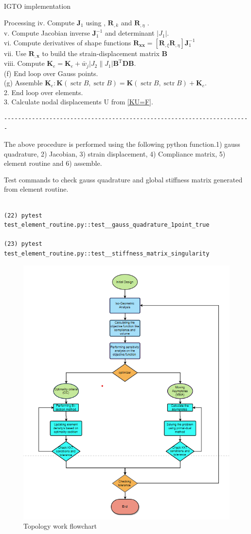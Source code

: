 \documentclass[a4paper,12pt,times]{article}
\begin{document}
\begin{section}{IGTO implementation}
\begin{subsection}{Processing}
iv. Compute $\mathbf{J}_{1}$ using , $\mathbf{R}_{, k}$ and $\mathbf{R}_{, \eta}$ .\\
v. Compute Jacobian inverse $\mathbf{J}_{1}^{-1}$ and determinant $\left|J_{1}\right|$.\\
vi. Compute derivatives of shape functions $\mathbf{R}_{\mathbf{x} \mathbf{x}}=\left[\mathbf{R}_{, \xi} \mathbf{R}_{, \eta}\right] \mathbf{J}_{1}^{-1}$ \\
vii. Use $\mathbf{R}_{, \mathbf{x}}$ to build the strain-displacement matrix $\mathbf{B}$\\ viii. Compute $\mathbf{K}_{e}=\mathbf{K}_{e}+\bar{w}_{j}\left|J_{2} \| J_{1}\right| \mathbf{B}^{\mathrm{T}} \mathbf{D B}$.\\
(f) End loop over Gauss points.\\
(g) Assemble $\mathbf{K}_{e}: \mathbf{K}(\operatorname{sctr} B, \operatorname{sctr} B)=\mathbf{K}(\operatorname{sctr} B, \operatorname{sctr} B)+\mathbf{K}_{e}$.\\
2. End loop over elements.\\
3. Calculate nodal displacements U from \ref{KU=F}.
\begin{verbatim}
-----------------------------------------------------------------------
\end{verbatim}
The above procedure is performed using the following python function.1) gauss quadrature, 2) Jacobian, 3) strain displacement, 4) Compliance matrix, 5) element routine and 6) assemble.

Test commands to check gauss quadrature and global stiffness matrix generated from element routine.
\begin{lstlisting}

(22) pytest test_element_routine.py::test__gauss_quadrature_1point_true

(23) pytest test_element_routine.py::test__stiffness_matrix_singularity

\end{lstlisting}
\begin{figure}[h!]
\centering
\includegraphics[width=0.65\linewidth]{topology flowchart.png}
\caption{Topology work flowchart}
\label{fig:Topology flowchart}
\end{figure}

\end{subsection}
\end{section}
\end{document}
